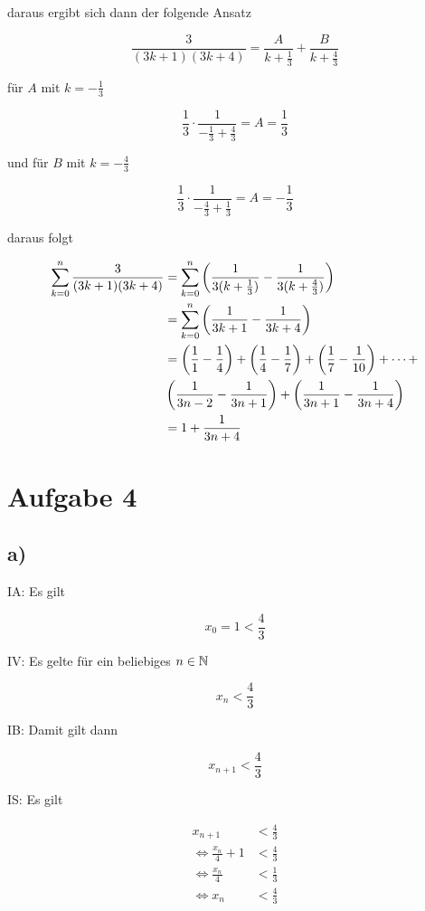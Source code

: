 \documentclass[a4paper, 11pt]{article}
\begin{document}
daraus ergibt sich dann der folgende Ansatz

$$ \frac{3}{(3k + 1)(3k + 4)} =
    \frac{A}{k + \frac{1}{3}} +
    \frac{B}{k + \frac{4}{3}} $$

für \(A\) mit \(k = -\frac{1}{3}\)

$$ \frac{1}{3} \cdot \frac{1}{-\frac{1}{3} + \frac{4}{3}} = A = \frac{1}{3} $$

und für \(B\) mit \(k = -\frac{4}{3}\)

$$ \frac{1}{3} \cdot \frac{1}{-\frac{4}{3} + \frac{1}{3}} = A = -\frac{1}{3} $$

daraus folgt

\begin{align*}
    \sum_{k = 0}^{n} \frac{3}{(3k + 1)(3k + 4)} &=
        \sum_{k = 0}^{n} \left( \frac{1}{3(k + \frac{1}{3})} -
            \frac{1}{3(k + \frac{4}{3})} \right) \\
    &= \sum_{k = 0}^{n} \left( \frac{1}{3k + 1} - \frac{1}{3k + 4} \right) \\
    &= \left(\frac{1}{1} - \frac{1}{4}\right) +
        \left(\frac{1}{4} - \frac{1}{7}\right) +
        \left(\frac{1}{7} - \frac{1}{10}\right) + \dots + \\
       & \left( \frac{1}{3n - 2} - \frac{1}{3n + 1} \right) +
        \left( \frac{1}{3n + 1} - \frac{1}{3n + 4} \right) \\
    &= 1 + \frac{1}{3n + 4}
\end{align*}

\section{Aufgabe 4}
\label{sec:org74c5541}
\subsection{a)}
\label{sec:org2f74de0}
IA: Es gilt

$$ x_0 = 1 < \frac{4}{3} $$

IV: Es gelte für ein beliebiges \(n \in \mathbb{N}\)

$$ x_n < \frac{4}{3} $$

IB: Damit gilt dann

$$ x_{n+1} < \frac{4}{3} $$

IS: Es gilt

\begin{align*}
    x_{n+1} &< \frac{4}{3} \\
    \Leftrightarrow \frac{x_n}{4} + 1 &< \frac{4}{3} \\
    \Leftrightarrow \frac{x_n}{4} &< \frac{1}{3} \\
    \Leftrightarrow x_n &< \frac{4}{3} \\
\end{align*}
\end{document}
